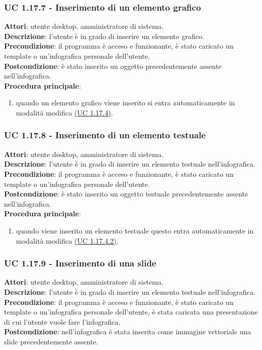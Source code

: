 \subsubsection{UC 1.17.7 - Inserimento di un elemento grafico}{
	\label{uc1.17.7}
	\textbf{Attori}: utente desktop, amministratore di sistema. \\
	\textbf{Descrizione}: l'utente è in grado di inserire un elemento grafico. \\
	\textbf{Precondizione}: il programma è acceso e funzionante, è stato caricato un template o un'infografica personale dell'utente.	\\
	\textbf{Postcondizione}: è stato inserito un oggetto precedentemente assente nell'infografica.	\\
	\textbf{Procedura principale}:
	\begin{enumerate}
		\item quando un elemento grafico viene inserito si entra automaticamente in modalità modifica \hyperref[uc1.17.4]{(UC 1.17.4)}.
	\end{enumerate}
	}
\subsubsection{UC 1.17.8 - Inserimento di un elemento testuale}{
	\label{uc1.17.8}
	\textbf{Attori}: utente desktop, amministratore di sistema. \\
	\textbf{Descrizione}: l'utente è in grado di inserire un elemento testuale nell'infografica. \\
	\textbf{Precondizione}: il programma è acceso e funzionante, è stato caricato un template o un'infografica personale dell'utente.	\\
	\textbf{Postcondizione}: è stato inserito un oggetto testuale precedentemente assente nell'infografica.	\\
	\textbf{Procedura principale}:
	\begin{enumerate}
		\item quando viene inserito un elemento testuale questo entra automaticamente in modalità modifica \hyperref[uc1.17.4.2]{(UC 1.17.4.2)}.
	\end{enumerate}
	}
\subsubsection{UC 1.17.9 - Inserimento di una slide}{
	\label{uc1.17.9}
	\textbf{Attori}: utente desktop, amministratore di sistema. \\
	\textbf{Descrizione}: l'utente è in grado di inserire un elemento testuale nell'infografica. \\
	\textbf{Precondizione}: il programma è acceso e funzionante, è stato caricato un template o un'infografica personale dell'utente, è stata caricata una presentazione di cui l'utente vuole fare l'infografica.	\\
	\textbf{Postcondizione}: nell'infografica è stata inserita come immagine vettoriale una slide precedentemente assente.	\\
	}
